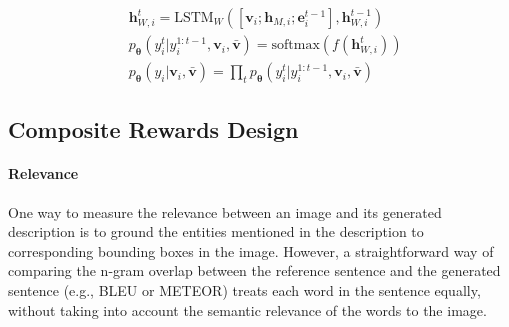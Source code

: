 \documentclass[letterpaper]{article} \usepackage{aaai20}  \usepackage{times}  \usepackage{helvet} \usepackage{courier}  \usepackage[hyphens]{url}  \usepackage{graphicx} \urlstyle{rm} \def\UrlFont{\rm}  \usepackage{graphicx}  \frenchspacing  \setlength{\pdfpagewidth}{8.5in}  \setlength{\pdfpageheight}{11in}  \usepackage{times}
\newcommand{\rbr}[1]{\left(#1\right)}
\newcommand{\hb}{\mathbf{h}}
\newcommand{\vb}{\mathbf{v}}
\newcommand{\eb}{\mathbf{e}}
\newcommand*{\thetab}{\bm{\theta}}
\begin{document}
\begin{align}
    &\hb_{W,i}^t = \text{LSTM}_W\rbr{[\vb_i; \hb_{M,i}; \eb_i^{t-1}], \hb_{W,i}^{t-1}} \\ \label{eq:prob}
    &p_{\thetab}(y_i^t| y_i^{1:t-1}, \vb_i, \bar{\vb}) = \text{softmax}(f(\hb_{W,i}^t)) \\
    &p_{\thetab}(y_i|\vb_i, \bar{\vb}) = \prod_t p_{\thetab}(y_i^t| y_i^{1:t-1}, \vb_i, \bar{\vb})
\end{align}

\subsection{Composite Rewards Design}
\label{sec:reward}
\paragraph{Relevance}
One way to measure the relevance between an image and its generated description is to ground the entities mentioned in the description to corresponding bounding boxes in the image. However, a straightforward way of comparing the n-gram overlap between the reference sentence and the generated sentence (e.g., BLEU or METEOR) treats each word in the sentence equally, without taking into account the semantic relevance of the words to the image. 
\end{document}

